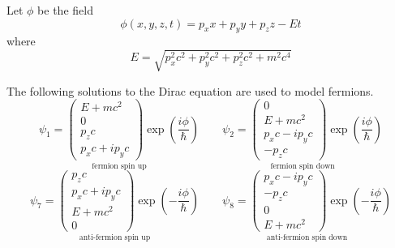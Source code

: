\documentclass[12pt]{article}
\begin{document}
\noindent
Let $\phi$ be the field
\begin{equation*}
\phi(x,y,z,t)=p_xx+p_yy+p_zz-Et
\end{equation*}
where
\begin{equation*}
E=\sqrt{p_x^2c^2+p_y^2c^2+p_z^2c^2+m^2c^4}
\end{equation*}

\noindent
The following solutions to the Dirac equation are used to model fermions.
\begin{equation*}
\underset{\text{fermion spin up}}
{
\psi_1=\begin{pmatrix}E+mc^2\\0\\p_zc\\p_xc+ip_yc\end{pmatrix}
\exp\left(\frac{i\phi}{\hbar}\right)
}
\qquad
\underset{\text{fermion spin down}}
{
\psi_2=\begin{pmatrix}0\\E+mc^2\\p_xc-ip_yc\\-p_zc\end{pmatrix}
\exp\left(\frac{i\phi}{\hbar}\right)
}
\end{equation*}
\begin{equation*}
\underset{\text{anti-fermion spin up}}
{
\psi_7=\begin{pmatrix}p_zc\\p_xc+ip_yc\\E+mc^2\\0\end{pmatrix}
\exp\left(-\frac{i\phi}{\hbar}\right)
}
\qquad
\underset{\text{anti-fermion spin down}}
{
\psi_8=\begin{pmatrix}p_xc-ip_yc\\-p_zc\\0\\E+mc^2\end{pmatrix}
\exp\left(-\frac{i\phi}{\hbar}\right)
}
\end{equation*}
\end{document}
